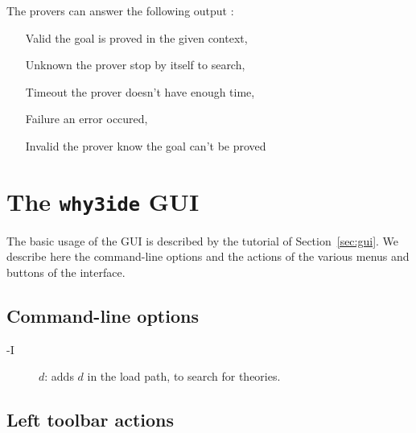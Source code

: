 The provers can answer the following output :
\begin{itemize}
\item[Valid] the goal is proved in the given context,
\item[Unknown] the prover stop by itself to search,
\item[Timeout] the prover doesn't have enough time,
\item[Failure] an error occured,
\item[Invalid] the prover know the goal can't be proved
\end{itemize}

\section{The \texttt{why3ide} GUI}
\label{sec:ideref}

The basic usage of the GUI is described by the tutorial of
Section~\ref{sec:gui}. We describe here the command-line options and
the actions of the various menus and buttons of the interface.

\subsection{Command-line options}

\begin{description}
\item[-I] $d$: adds $d$ in the load path, to search for theories.
\end{description}

\subsection{Left toolbar actions}

